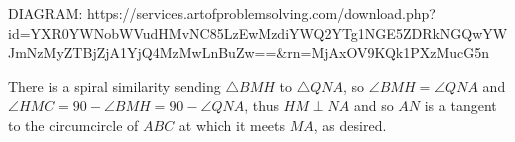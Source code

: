 DIAGRAM: https://services.artofproblemsolving.com/download.php?id=YXR0YWNobWVudHMvNC85LzEwMzdiYWQ2YTg1NGE5ZDRkNGQwYWJmNzMyZTBjZjA1YjQ4MzMwLnBuZw==&rn=MjAxOV9KQk1PXzMucG5n

There is a spiral similarity sending $\triangle BMH$ to $\triangle QNA$, so $\angle BMH=\angle QNA$ and $\angle HMC=90-\angle BMH=90-\angle QNA$, thus $HM\perp NA$ and so $AN$ is a tangent to the circumcircle of $ABC$ at which it meets $MA$, as desired.
